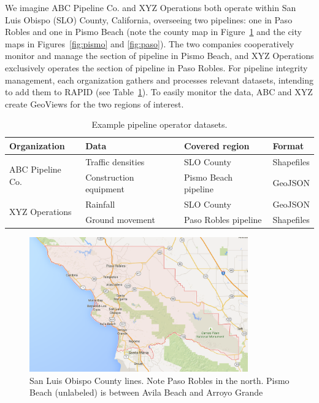 We imagine ABC Pipeline Co. and XYZ Operations both operate within San Luis Obispo (SLO) County, California, overseeing two pipelines: one in Paso Robles and one in Pismo Beach (note the county map in Figure~\ref{fig:county} and the city maps in Figures~\ref{fig:pismo} and \ref{fig:paso}). The two companies cooperatively monitor and manage the section of pipeline in Pismo Beach, and XYZ Operations exclusively operates the section of pipeline in Paso Robles. For pipeline integrity management, each organization gathers and processes relevant datasets, intending to add them to RAPID (see Table~\ref{table:layers}). To easily monitor the data, ABC and XYZ create GeoViews for the two regions of interest.

\begin{table}[ht]

\begin{tabular}{ |l|l|l|l| }
\hline
Organization & Data & Covered region & Format\\
\hline
\multirow{2}{*}{ABC Pipeline Co.}
 & Traffic densities & SLO County & Shapefiles \\ \cline{2-4}
 & Construction equipment & Pismo Beach pipeline & GeoJSON \\ \hline
\multirow{2}{*}{XYZ Operations}
 & Rainfall & SLO County & GeoJSON \\ \cline{2-4}
 & Ground movement & Paso Robles pipeline & Shapefiles \\ \hline
\end{tabular}
\caption{Example pipeline operator datasets.}
\label{table:layers}
\end{table}

\begin{figure}[ht]
    \centering
    \includegraphics[width=0.84\textwidth]{figures/county.png}
    \caption{San Luis Obispo County lines. Note Paso Robles in the north. Pismo Beach (unlabeled) is between Avila Beach and Arroyo Grande}
    \label{fig:county}
\end{figure}

